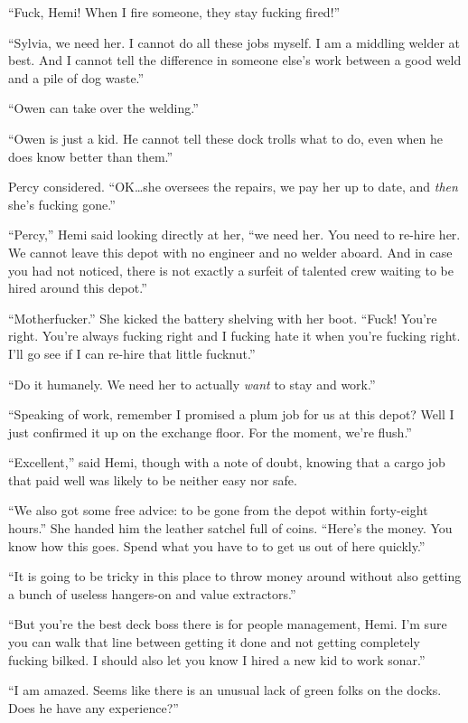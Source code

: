\documentclass[
]{scrbook}
\begin{document}
``Fuck, Hemi! When I fire someone, they stay fucking fired!''

``Sylvia, we need her. I cannot do all these jobs myself. I am a
middling welder at best. And I cannot tell the difference in someone
else's work between a good weld and a pile of dog waste.''

``Owen can take over the welding.''

``Owen is just a kid. He cannot tell these dock trolls what to do, even
when he does know better than them.''

Percy considered. ``OK\ldots she oversees the repairs, we pay her up to
date, and \emph{then} she's fucking gone.''

``Percy,'' Hemi said looking directly at her, ``we need her. You need to
re-hire her. We cannot leave this depot with no engineer and no welder
aboard. And in case you had not noticed, there is not exactly a surfeit
of talented crew waiting to be hired around this depot.''

``Motherfucker.'' She kicked the battery shelving with her boot. ``Fuck!
You're right. You're always fucking right and I fucking hate it when
you're fucking right. I'll go see if I can re-hire that little
fucknut.''

``Do it humanely. We need her to actually \emph{want} to stay and
work.''

``Speaking of work, remember I promised a plum job for us at this depot?
Well I just confirmed it up on the exchange floor. For the moment, we're
flush.''

``Excellent,'' said Hemi, though with a note of doubt, knowing that a
cargo job that paid well was likely to be neither easy nor safe.

``We also got some free advice: to be gone from the depot within
forty-eight hours.'' She handed him the leather satchel full of coins.
``Here's the money. You know how this goes. Spend what you have to to
get us out of here quickly.''

``It is going to be tricky in this place to throw money around without
also getting a bunch of useless hangers-on and value extractors.''

``But you're the best deck boss there is for people management, Hemi.
I'm sure you can walk that line between getting it done and not getting
completely fucking bilked. I should also let you know I hired a new kid
to work sonar.''

``I am amazed. Seems like there is an unusual lack of green folks on the
docks. Does he have any experience?''
\end{document}
